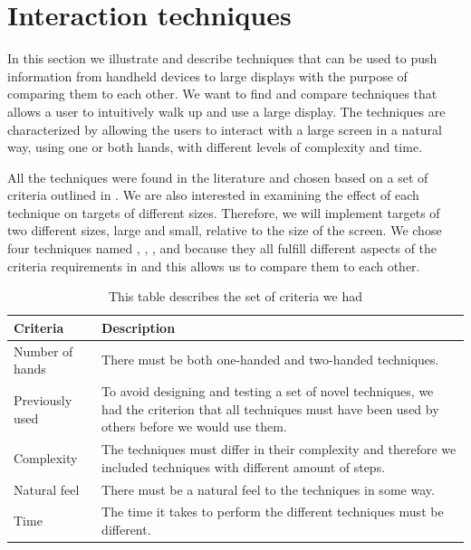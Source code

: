 \section{Interaction techniques} \label{sec:techniques}
In this section we illustrate and describe techniques that can be used to push information from handheld devices to large displays with the purpose of comparing them to each other.
We want to find and compare techniques that allows a user to intuitively walk up and use a large display.
The techniques are characterized by allowing the users to interact with a large screen in a natural way, using one or both hands, with different levels of complexity and time.

All the techniques were found in the literature and chosen based on a set of criteria outlined in . 
We are also interested in examining the effect of each technique on targets of different sizes. 
Therefore, we will implement targets of two different sizes, large and small, relative to the size of the screen. 
We chose four techniques named \swipe, \tilt, \throw, and \pinch because they all fulfill different aspects of the criteria requirements in  and this allows us to compare them to each other.

\begin{table}[H]
	\centering
	\begin{tabular}{|p{}|p{}|}
		\hline
		\rowcolor[HTML]{9B9B9B} 
		\textbf{Criteria} & \textbf{Description} \\ \hline
		Number of hands & There must be both one-handed and two-handed techniques. \\ \hline
		Previously used & To avoid designing and testing a set of novel techniques, we had the criterion that all techniques must have been used by others before we would use them. \\ \hline
		Complexity & The techniques must differ in their complexity and therefore we included techniques with different amount of steps. \\ \hline
		Natural feel & There must be a natural feel to the techniques in some way. \\ \hline
		Time & The time it takes to perform the different techniques must be different. \\ \hline
	\end{tabular}
	\caption{This table describes the set of criteria we had }
	\label{tab:techniqueCriteria}
\end{table}

